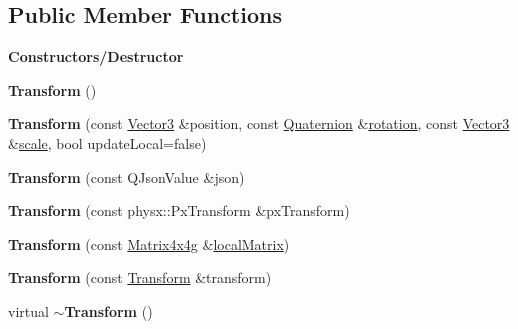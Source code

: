\subsection*{Public Member Functions}
\begin{Indent}\textbf{ Constructors/\+Destructor}\par
\begin{DoxyCompactItemize}
\item 
\mbox{\label{classrev_1_1_transform_ac568f331c98bbb8b8710f692e708376a}} 
{\bfseries Transform} ()
\item 
\mbox{\label{classrev_1_1_transform_acb047fbca2651394c497623d24327ddc}} 
{\bfseries Transform} (const \mbox{\hyperlink{classrev_1_1_vector}{Vector3}} \&position, const \mbox{\hyperlink{classrev_1_1_quaternion}{Quaternion}} \&\mbox{\hyperlink{classrev_1_1_transform_ab6f61407589970718fe582c2277e881b}{rotation}}, const \mbox{\hyperlink{classrev_1_1_vector}{Vector3}} \&\mbox{\hyperlink{classrev_1_1_transform_ae79acfc2983211eb4c1208f825256d7a}{scale}}, bool update\+Local=false)
\item 
\mbox{\label{classrev_1_1_transform_a09861fa5669c6cff678ca5435af4ce5c}} 
{\bfseries Transform} (const Q\+Json\+Value \&json)
\item 
\mbox{\label{classrev_1_1_transform_a72eaa791a88758928f31b3b8db5f57d8}} 
{\bfseries Transform} (const physx\+::\+Px\+Transform \&px\+Transform)
\item 
\mbox{\label{classrev_1_1_transform_ab8ef6f51f54ecfb2e346b810ff8148d3}} 
{\bfseries Transform} (const \mbox{\hyperlink{classrev_1_1_square_matrix}{Matrix4x4g}} \&\mbox{\hyperlink{classrev_1_1_transform_a3ff4acf39a7481c0c1f3c0318738013f}{local\+Matrix}})
\item 
\mbox{\label{classrev_1_1_transform_a43ee36ee31ac531ba66768339dcba936}} 
{\bfseries Transform} (const \mbox{\hyperlink{classrev_1_1_transform}{Transform}} \&transform)
\item 
\mbox{\label{classrev_1_1_transform_a59f21f7628a49a90b5bbe1a5060118dd}} 
virtual {\bfseries $\sim$\+Transform} ()
\end{DoxyCompactItemize}
\end{Indent}
